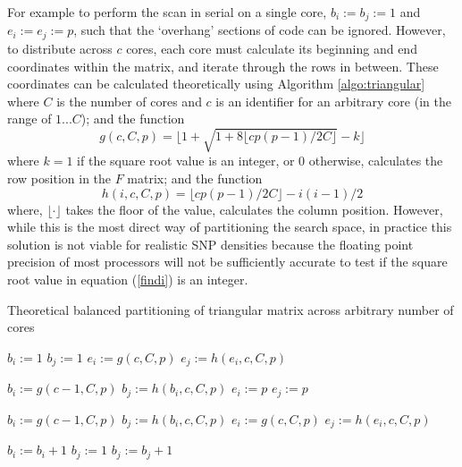 For example to perform the scan in serial on a single core, $b_i := b_j := 1$ and $e_i := e_j := p$, such that the `overhang' sections of code can be ignored. However, to distribute across $c$ cores, each core must calculate its beginning and end coordinates within the matrix, and iterate through the rows in between. These coordinates can be calculated theoretically using Algorithm \ref{algo:triangular} where $C$ is the number of cores and $c$ is an identifier for an arbitrary core (in the range of $1...C$); and the function
\begin{equation}
g(c, C, p) = \lfloor 1 + \sqrt{1 + 8 \lfloor cp(p-1)/2C \rfloor} - k \rfloor \label{findi}
\end{equation}
where $k = 1$ if the square root value is an integer, or 0 otherwise, calculates the row position in the $F$ matrix; and the function
\begin{equation}
h(i, c, C, p) = \lfloor cp(p-1)/2C \rfloor - i(i-1)/2
\end{equation}
where, $\lfloor \cdot \rfloor$ takes the floor of the value, calculates the column position. However, while this is the most direct way of partitioning the search space, in practice this solution is not viable for realistic SNP densities because the floating point precision of most processors will not be sufficiently accurate to test if the square root value in equation (\ref{findi}) is an integer.

\begin{algorithm}
\caption{Theoretical balanced partitioning of triangular matrix across arbitrary number of cores}
\label{algo:triangular}
\begin{algorithmic}


  \STATE $b_i := 1$
  \STATE $b_j := 1$
  \STATE $e_i := g(c, C, p) $
  \STATE $e_j := h(e_i, c, C, p) $

  \STATE $b_i := g(c-1, C, p)$
  \STATE $b_j := h(b_i, c, C, p)$
  \STATE $e_i := p$
  \STATE $e_j := p$

\ELSE
  \STATE $b_i := g(c-1, C, p)$
  \STATE $b_j := h(b_i, c, C, p)$
  \STATE $e_i := g(c, C, p) $
  \STATE $e_j := h(e_i, c, C, p) $
\ENDIF

    \STATE $b_i := b_i+1$
    \STATE $b_j := 1$
  \ELSE
    \STATE $b_j := b_j+1$
  \ENDIF

\end{algorithmic}
\end{algorithm}

